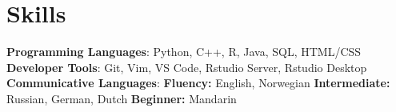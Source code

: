 \documentclass[letterpaper,11pt]{article}
\begin{document}
\section{Skills}
 \begin{itemize}[leftmargin=0.15in, label={}]
    \small{\item{
     \textbf{Programming Languages}{: Python, C++, R, Java, SQL, HTML/CSS} \\
     \textbf{Developer Tools}{: Git, Vim,  VS Code, Rstudio Server, Rstudio Desktop} \\
    \textbf{Communicative Languages}{: \textbf{Fluency:} English, Norwegian \textbf{Intermediate:} Russian, German, Dutch \textbf{Beginner:} Mandarin} \\
    }}
 \end{itemize}


\end{document}
